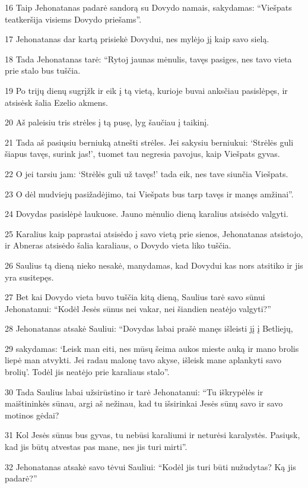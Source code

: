 \par 16 Taip Jehonatanas padarė sandorą su Dovydo namais, sakydamas: “Viešpats teatkeršija visiems Dovydo priešams”. 
\par 17 Jehonatanas dar kartą prisiekė Dovydui, nes mylėjo jį kaip savo sielą. 
\par 18 Tada Jehonatanas tarė: “Rytoj jaunas mėnulis, tavęs pasiges, nes tavo vieta prie stalo bus tuščia. 
\par 19 Po trijų dienų sugrįžk ir eik į tą vietą, kurioje buvai anksčiau pasislėpęs, ir atsisėsk šalia Ezelio akmens. 
\par 20 Aš paleisiu tris strėles į tą pusę, lyg šaučiau į taikinį. 
\par 21 Tada aš pasiųsiu berniuką atnešti strėles. Jei sakysiu berniukui: ‘Strėlės guli šiapus tavęs, surink jas!’, tuomet tau negresia pavojus, kaip Viešpats gyvas. 
\par 22 O jei tarsiu jam: ‘Strėlės guli už tavęs!’ tada eik, nes tave siunčia Viešpats. 
\par 23 O dėl mudviejų pasižadėjimo, tai Viešpats bus tarp tavęs ir manęs amžinai”. 
\par 24 Dovydas pasislėpė laukuose. Jauno mėnulio dieną karalius atsisėdo valgyti. 
\par 25 Karalius kaip paprastai atsisėdo į savo vietą prie sienos, Jehonatanas atsistojo, ir Abneras atsisėdo šalia karaliaus, o Dovydo vieta liko tuščia. 
\par 26 Saulius tą dieną nieko nesakė, manydamas, kad Dovydui kas nors atsitiko ir jis yra susitepęs. 
\par 27 Bet kai Dovydo vieta buvo tuščia kitą dieną, Saulius tarė savo sūnui Jehonatanui: “Kodėl Jesės sūnus nei vakar, nei šiandien neatėjo valgyti?” 
\par 28 Jehonatanas atsakė Sauliui: “Dovydas labai prašė manęs išleisti jį į Betliejų, 
\par 29 sakydamas: ‘Leisk man eiti, nes mūsų šeima aukos mieste auką ir mano brolis liepė man atvykti. Jei radau malonę tavo akyse, išleisk mane aplankyti savo brolių’. Todėl jis neatėjo prie karaliaus stalo”. 
\par 30 Tada Saulius labai užsirūstino ir tarė Jehonatanui: “Tu iškrypėlės ir maištininkės sūnau, argi aš nežinau, kad tu išsirinkai Jesės sūnų savo ir savo motinos gėdai? 
\par 31 Kol Jesės sūnus bus gyvas, tu nebūsi karaliumi ir neturėsi karalystės. Pasiųsk, kad jis būtų atvestas pas mane, nes jis turi mirti”. 
\par 32 Jehonatanas atsakė savo tėvui Sauliui: “Kodėl jis turi būti nužudytas? Ką jis padarė?” 
